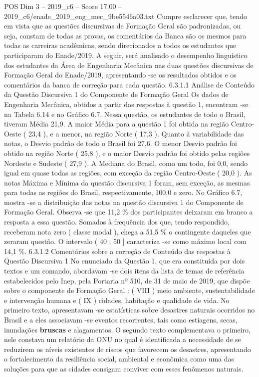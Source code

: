 \begin{textsample}{POS Dim 3 – 2019\_c6 – Score 17.00 – 2019\_c6/enade\_2019\_eng\_mec\_9be5546a03.txt}
Cumpre esclarecer que, tendo em vista que as questões discursivas de Formação Geral são padronizadas, ou seja, constam de todas as provas, os comentários da Banca são os mesmos para todas as carreiras acadêmicas, sendo direcionados a todos os estudantes que participaram do Enade/2019.
A seguir, será analisado o desempenho linguístico dos estudantes da Área de Engenharia Mecânica nas duas questões discursivas de Formação Geral do Enade/2019, apresentando -se os resultados obtidos e os comentários da banca de correção para cada questão. 6.3.1.1 Análise de Conteúdo da Questão Discursiva 1 do Componente de Formação Geral Os dados de Engenharia Mecânica, obtidos a partir das respostas à questão 1, encontram -se na Tabela 6.14 e no Gráfico 6.7.
Nessa questão, os estudantes de todo o Brasil, tiveram Média 21,9.
A maior Média para a questão 1 foi obtida na região Centro-Oeste ( 23,4 ), e a menor, na região Norte ( 17,3 ).
Quanto à variabilidade das notas, o Desvio padrão de todo o Brasil foi 27,6.
O menor Desvio padrão foi obtido na região Norte ( 25,8 ), e o maior Desvio padrão foi obtido pelas regiões Nordeste e Sudeste ( 27,9 ).
A Mediana do Brasil, como um todo, foi 0,0, sendo igual em quase todas as regiões, com exceção da região Centro-Oeste ( 20,0 ).
As notas Máxima e Mínima da questão discursiva 1 foram, sem exceção, as mesmas para todas as regiões do Brasil, respectivamente, 100,0 e zero.
No Gráfico 6.7, mostra -se a distribuição das notas na questão discursiva 1 do Componente de Formação Geral.
Observa -se que 11,2 \% dos participantes deixaram em branco a resposta a essa questão.
Somados à frequência dos que, tendo respondido, receberam nota zero ( classe modal ), chega a 51,5 \% o contingente daqueles que zeraram questão.
O intervalo ( 40 ; 50 ] caracteriza -se como máximo local com 14,1 \%. 6.3.1.2 Comentários sobre a correção de Conteúdo das respostas à Questão Discursiva 1 No enunciado da Questão 1, que era constituída por dois textos e um comando, abordavam -se dois itens da lista de temas de referência estabelecidos pelo Inep, pela Portaria nº 510, de 31 de maio de 2019, que dispõe sobre o componente de Formação Geral : ( VIII ) meio ambiente, sustentabilidade e intervenção humana e ( IX ) cidades, habitação e qualidade de vida.
No primeiro texto, apresentavam -se estatísticas sobre desastres naturais ocorridos no Brasil e a eles associavam -se eventos recorrentes, tais como estiagens, secas, inundações \textbf{bruscas} e alagamentos.
O segundo texto complementava o primeiro, nele constava um relatório da ONU no qual é identificada a necessidade de se reduzirem os níveis existentes de riscos que favorecem os desastres, apresentando o fortalecimento da resiliência social, ambiental e econômica como uma das soluções para que as cidades consigam conviver com esses fenômenos naturais.

\end{textsample}
